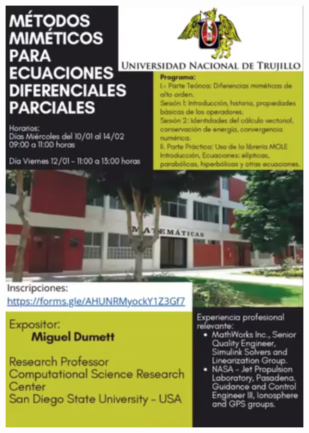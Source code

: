 \begin{figure}[ht!]
	\centering
	\includegraphics[width=.3\paperwidth]{mole2024}\quad

\end{figure}
